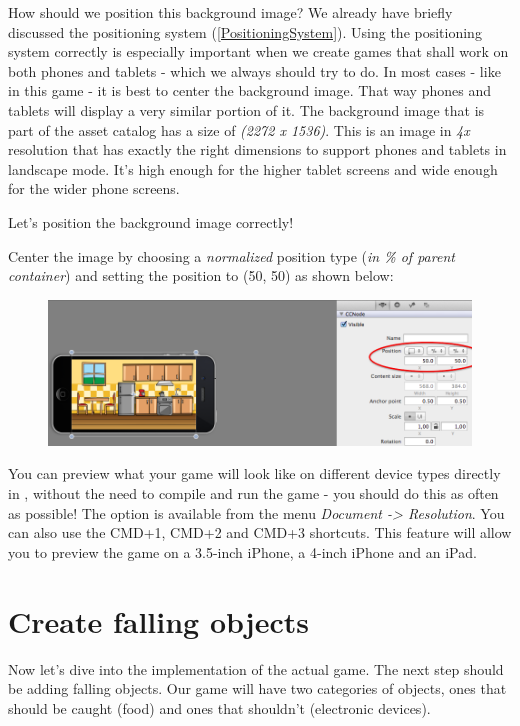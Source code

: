 How should we position this background image? We already have briefly discussed
the \SB{} positioning system (\ref{PositioningSystem}). Using the positioning
system correctly is especially important when we create games that shall work on
both phones and tablets - which we always should try to do. In most cases - like
in this game - it is best to center the background image. That way phones
and tablets will display a very similar portion of it. The background image that
is part of the asset catalog has a size of \textit{(2272 x 1536)}. This is an
image in \textit{4x} resolution that has exactly the right dimensions to support
phones and tablets in landscape mode. It's high enough for the higher tablet
screens and wide enough for the wider phone screens.

Let's position the background image correctly!
\begin{leftbar}
Center the image by choosing a \textit{normalized} position type (\textit{in \%
of parent container}) and setting the position to (50, 50) as shown below:
\begin{figure}[H]
    \centering
    \includegraphics[width=0.9\linewidth]{images/Chapter2/center_background.png}
\end{figure}
\end{leftbar}

You can preview what your game will look like on different device types directly
in \SB{}, without the need to compile and run the game - you should do this as
often as possible! The option is available from the menu \textit{Document ->
Resolution}. You can also use the CMD+1, CMD+2 and CMD+3 shortcuts. This feature
will allow you to preview the game on a 3.5-inch iPhone, a 4-inch iPhone and an
iPad. \label{preview_screen_sizes}

\section{Create falling objects}
Now let's dive into the implementation of the actual game. The next step should
be adding falling objects. Our game will have two categories of objects, ones
that should be caught (food) and ones that shouldn't (electronic devices).

